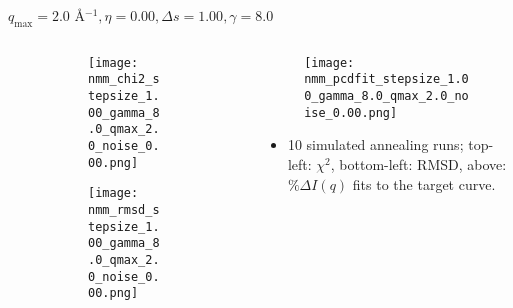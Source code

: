 \documentclass{beamer}
\begin{document}
\begin{frame}{$ q_{\textrm{max}}=2.0 $ \AA $^{-1}, \eta=0.00, \Delta s=1.00, \gamma=8.0$}
	\begin{columns}
		\begin{column}{.5\textwidth}
			\begin{figure}[H]
			\centering
			\begin{subfigure}[b]{\textwidth}
				\centering
				\texttt{[image: nmm\_chi2\_stepsize\_1.00\_gamma\_8.0\_qmax\_2.0\_noise\_0.00.png]}
				\label{fig:}
			\end{subfigure}
			\begin{subfigure}[b]{\textwidth}
				\centering
				\texttt{[image: nmm\_rmsd\_stepsize\_1.00\_gamma\_8.0\_qmax\_2.0\_noise\_0.00.png]}
				\label{fig:}
			\end{subfigure}
			\end{figure}
		\end{column}
		\begin{column}{.5\textwidth}
			\begin{figure}[H]
				\centering
				\texttt{[image: nmm\_pcdfit\_stepsize\_1.00\_gamma\_8.0\_qmax\_2.0\_noise\_0.00.png]}
				\label{fig:}
			\end{figure}
			\begin{itemize}
				\item 10 simulated annealing runs; top-left: $\chi^2$, bottom-left: RMSD, above: $\%\Delta I(q)$ fits to the target curve.
			\end{itemize}
		\end{column}
	\end{columns}
\end{frame}
 
\end{document}
